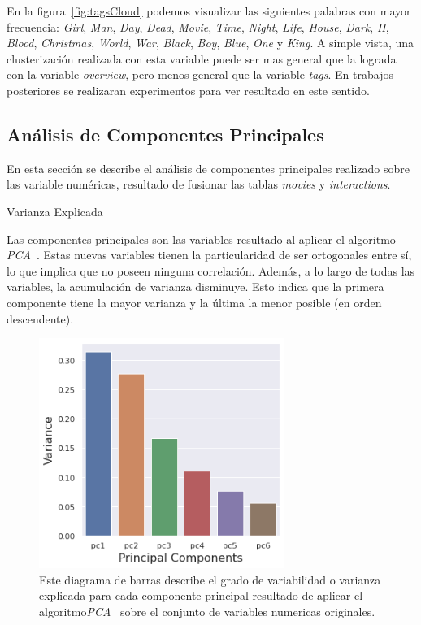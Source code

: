 \documentclass[11pt,a4paper,twoside]{thesis}
\begin{document}
En la figura~\ref{fig:tagsCloud} podemos visualizar las siguientes palabras con
mayor frecuencia: \textit{Girl}, \textit{Man}, \textit{Day}, \textit{Dead},
\textit{Movie}, \textit{Time}, \textit{Night}, \textit{Life}, \textit{House},
\textit{Dark}, \textit{II}, \textit{Blood}, \textit{Christmas}, \textit{World},
\textit{War}, \textit{Black}, \textit{Boy}, \textit{Blue}, \textit{One} y
\textit{King}. A simple vista, una clusterización realizada con esta variable
puede ser mas general que la lograda con la variable \textit{overview}, pero
menos general que la variable \textit{tags}. En trabajos posteriores se
realizaran experimentos para ver resultado en este sentido.

\clearpage

\subsection{Análisis de Componentes Principales}

En esta sección se describe el análisis de componentes principales realizado
sobre las variable numéricas, resultado de fusionar las tablas \textit{movies}
y \textit{interactions}.

\begin{description}
	\item[Varianza Explicada]
\end{description}

Las componentes principales son las variables resultado al aplicar el algoritmo
\textit{PCA}~\cite{pca}. Estas nuevas variables tienen la particularidad de ser
ortogonales entre sí, lo que implica que no poseen ninguna correlación. Además,
a lo largo de todas las variables, la acumulación de varianza disminuye. Esto
indica que la primera componente tiene la mayor varianza y la última la menor
posible (en orden descendente).

\begin{figure}[h!]
	\centering
	\includegraphics[width=8cm]{./images/PCA-Variance.png}
	\caption{Este diagrama de barras describe el grado de variabilidad o varianza explicada para cada componente principal resultado de aplicar el algoritmo\textit{PCA}~\cite{pca} sobre el conjunto de variables numericas originales.}
	\label{fig:explainedVariancePlot}
\end{figure}
\end{document}
